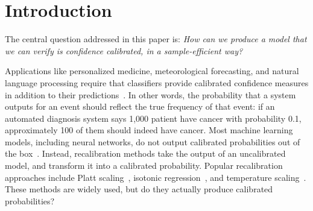 \section{Introduction}

The central question addressed in this paper is: \emph{How can we produce a model that we can verify is confidence calibrated, in a sample-efficient way?}

Applications like personalized medicine, meteorological forecasting, and natural language processing  require that classifiers provide calibrated confidence measures in addition to their predictions~\cite{jiang2012calibrating, brocker2009decomposition, nguyen2015posterior}.
In other words, the probability that a system outputs for an event should reflect the true frequency of that event: if an automated diagnosis system says 1,000 patient have cancer with probability 0.1, approximately 100 of them should indeed have cancer.
Most machine learning models, including neural networks, do not output calibrated probabilities out of the box~\cite{guo2017calibration, zadrozny2001calibrated}.
Instead, recalibration methods take the output of an uncalibrated model, and transform it into a calibrated probability.
Popular recalibration approaches include Platt scaling~\cite{platt1999probabilistic}, isotonic regression~\cite{zadrozny2002transforming}, and temperature scaling~\cite{guo2017calibration}.  These methods are widely used, but do they actually produce calibrated probabilities?

